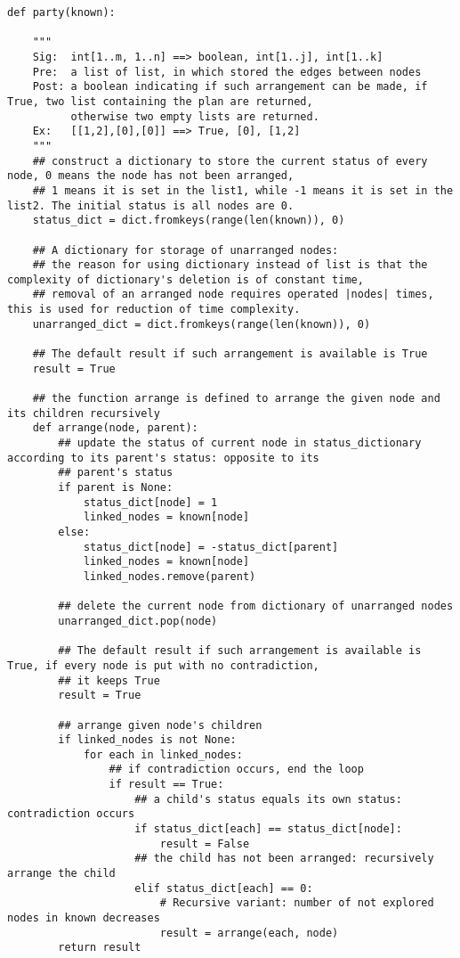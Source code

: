 \documentclass[a4paper,11pt]{article}
\begin{document}
\begin{lstlisting}
def party(known):

    """
    Sig:  int[1..m, 1..n] ==> boolean, int[1..j], int[1..k]
    Pre:  a list of list, in which stored the edges between nodes
    Post: a boolean indicating if such arrangement can be made, if True, two list containing the plan are returned,
          otherwise two empty lists are returned.
    Ex:   [[1,2],[0],[0]] ==> True, [0], [1,2]
    """
    ## construct a dictionary to store the current status of every node, 0 means the node has not been arranged,
    ## 1 means it is set in the list1, while -1 means it is set in the list2. The initial status is all nodes are 0.
    status_dict = dict.fromkeys(range(len(known)), 0)

    ## A dictionary for storage of unarranged nodes:
    ## the reason for using dictionary instead of list is that the complexity of dictionary's deletion is of constant time,
    ## removal of an arranged node requires operated |nodes| times, this is used for reduction of time complexity.
    unarranged_dict = dict.fromkeys(range(len(known)), 0)

    ## The default result if such arrangement is available is True
    result = True

    ## the function arrange is defined to arrange the given node and its children recursively
    def arrange(node, parent):
        ## update the status of current node in status_dictionary according to its parent's status: opposite to its
        ## parent's status
        if parent is None:
            status_dict[node] = 1
            linked_nodes = known[node]
        else:
            status_dict[node] = -status_dict[parent]
            linked_nodes = known[node]
            linked_nodes.remove(parent)

        ## delete the current node from dictionary of unarranged nodes
        unarranged_dict.pop(node)

        ## The default result if such arrangement is available is True, if every node is put with no contradiction,
        ## it keeps True
        result = True

        ## arrange given node's children
        if linked_nodes is not None:
            for each in linked_nodes:
                ## if contradiction occurs, end the loop
                if result == True:
                    ## a child's status equals its own status: contradiction occurs
                    if status_dict[each] == status_dict[node]:
                        result = False
                    ## the child has not been arranged: recursively arrange the child
                    elif status_dict[each] == 0:
                        # Recursive variant: number of not explored nodes in known decreases
                        result = arrange(each, node)
        return result


\end{lstlisting}
\end{document}
